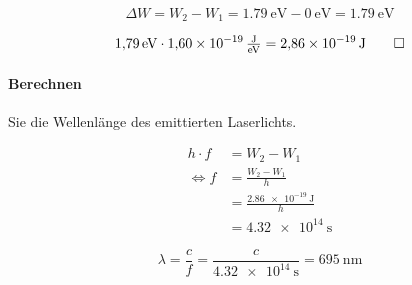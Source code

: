 \documentclass{ajc}
\begin{document}
	\begin{equation}
		\Delta W = W_2 -W_1 = \SI{1.79}{\eV} - \SI{0}{\eV} = \SI{1.79}{\eV}
	\end{equation}
		
	\begin{equation}
		\SI{1.79}{\eV} \cdot \SI{1.60e-19}{\J\per\eV} = \SI{2,86e-19}{\J} \qed
	\end{equation}

	\paragraph{Berechnen} Sie die Wellenlänge des emittierten Laserlichts.
	
	\begin{equation}
		\begin{split}
			h \cdot f &= W_2 -W_1 \\
			\Leftrightarrow f &= \frac{W_2 -W_1}{h} \\
			&= \frac{\SI{2,86e-19}{\J}}{h} \\
			&= \SI{4,32e14}{\s}
		\end{split}
	\end{equation}
	
	\begin{equation}
		\lambda = \frac{c}{f} = \frac{c}{\SI{4,32e14}{\s}} = \SI{695}{\nm}
	\end{equation}
	
	
\end{document}
